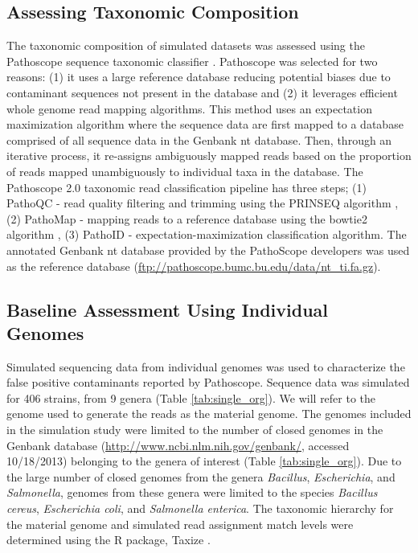 \documentclass[fleqn,10pt,lineno]{wlpeerj}\usepackage[]{graphicx}\usepackage[]{color}
\begin{document}
\subsection*{Assessing Taxonomic Composition}
The taxonomic composition of simulated datasets was assessed using the Pathoscope sequence taxonomic classifier \citep{Francis2013}.
Pathoscope was selected for two reasons: (1) it uses a large reference database reducing potential biases due to contaminant sequences not present in the database and (2) it leverages efficient whole genome read mapping algorithms.
This method uses an expectation maximization algorithm where the sequence data are first mapped to a database comprised of all sequence data in the Genbank nt database.
Then, through an iterative process, it re-assigns ambiguously mapped reads based on the proportion of reads mapped unambiguously to individual taxa in the database.
The Pathoscope 2.0 taxonomic read classification pipeline has three steps; (1) PathoQC - read quality filtering and trimming using the PRINSEQ algorithm \citep{schmieder2011quality}, (2) PathoMap - mapping reads to a reference database using the bowtie2 algorithm \citep{Langmead2012}, (3) PathoID - expectation-maximization classification algorithm.
The annotated Genbank nt database provided by the PathoScope developers was used as the reference database (\url{ftp://pathoscope.bumc.bu.edu/data/nt\_ti.fa.gz}).

\subsection*{Baseline Assessment Using Individual Genomes}
Simulated sequencing data from individual genomes was used to characterize the false positive contaminants reported by Pathoscope. 
Sequence data was simulated for 406 strains, from 9 genera (Table \ref{tab:single_org}).
We will refer to the genome used to generate the reads as the material genome.
The genomes included in the simulation study were limited to the number of closed genomes in the Genbank database (\url{http://www.ncbi.nlm.nih.gov/genbank/}, accessed 10/18/2013) belonging to the genera of interest (Table \ref{tab:single_org}).
Due to the large number of closed genomes from the genera \textit{Bacillus}, \textit{Escherichia}, and \textit{Salmonella}, genomes from these genera were limited to the species \textit{Bacillus cereus}, \textit{Escherichia coli}, and \textit{Salmonella enterica}.
The taxonomic hierarchy for the material genome and simulated read assignment match levels were determined using the R package, Taxize \citep{TaxizeArticle,TaxizeManual}.
\end{document}
